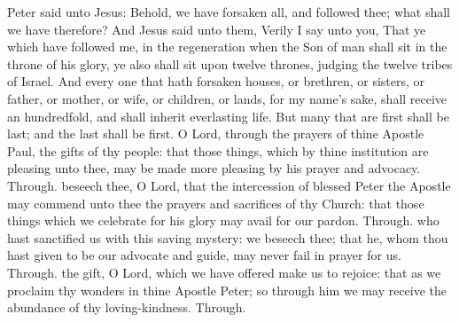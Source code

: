  Peter said unto Jesus: Behold, we have forsaken all, and followed thee; what shall we have therefore? And Jesus said unto them, Verily I say unto you, That ye which have followed me, in the regeneration when the Son of man shall sit in the throne of his glory, ye also shall sit upon twelve thrones, judging the twelve tribes of Israel. And every one that hath forsaken houses, or brethren, or sisters, or father, or mother, or wife, or children, or lands, for my name's sake, shall receive an hundredfold, and shall inherit everlasting life. But many that are first shall be last; and the last shall be first.
\secret
{} O Lord, through the prayers of thine Apostle Paul, the gifts of thy people: that those things, which by thine institution are pleasing unto thee, may be made more pleasing by his prayer and advocacy. Through.
 beseech thee, O Lord, that the intercession of blessed Peter the Apostle may commend unto thee the prayers and sacrifices of thy Church: that those things which we celebrate for his glory may avail for our pardon. Through.
\postcommunion
{} who hast sanctified us with this saving mystery: we beseech thee; that he, whom thou hast given to be our advocate and guide, may never fail in prayer for us. Through.
 the gift, O Lord, which we have offered make us to rejoice: that as we proclaim thy wonders in thine Apostle Peter; so through him we may receive the abundance of thy loving-kindness. Through.


\clearpage
